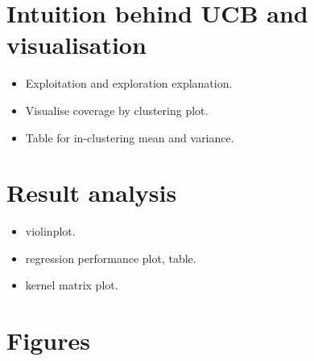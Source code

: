 \section{Intuition behind UCB and visualisation}

\begin{itemize}
    \item Exploitation and exploration explanation.
    \item Visualise coverage by clustering plot.
    \item Table for in-clustering mean and variance.
\end{itemize}

\section{Result analysis}

\begin{itemize}
    \item violinplot.
    \item regression performance plot, table.
    \item kernel matrix plot.
\end{itemize}

\section{Figures}



